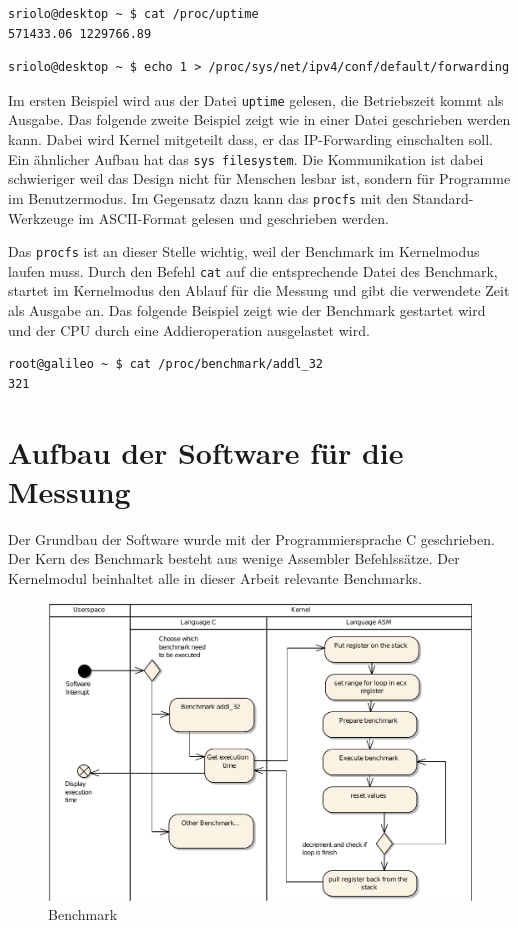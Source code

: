 \lstset{language=Bash}
\begin{lstlisting}
sriolo@desktop ~ $ cat /proc/uptime 
571433.06 1229766.89
\end{lstlisting}
\begin{lstlisting}
sriolo@desktop ~ $ echo 1 > /proc/sys/net/ipv4/conf/default/forwarding
\end{lstlisting}

Im ersten Beispiel wird aus der Datei \texttt{uptime} gelesen, die Betriebszeit kommt als Ausgabe. Das folgende zweite Beispiel zeigt wie in einer Datei geschrieben werden kann. Dabei wird Kernel mitgeteilt dass, er das IP-Forwarding einschalten soll. Ein ähnlicher Aufbau hat das \texttt{sys filesystem}. Die Kommunikation ist dabei schwieriger weil das Design nicht für Menschen lesbar ist, sondern für Programme im Benutzermodus. Im Gegensatz dazu kann das \texttt{procfs} mit den Standard-Werkzeuge im ASCII-Format gelesen und geschrieben werden.
\par
Das \texttt{procfs} ist an dieser Stelle wichtig, weil der Benchmark im Kernelmodus laufen muss. Durch den Befehl \texttt{cat} auf die entsprechende Datei des Benchmark, startet im Kernelmodus den Ablauf für die Messung und gibt die verwendete Zeit als Ausgabe an. Das folgende Beispiel zeigt wie der Benchmark gestartet wird und der CPU durch eine Addieroperation ausgelastet wird.

\begin{lstlisting}
root@galileo ~ $ cat /proc/benchmark/addl_32
321
\end{lstlisting}


\section{Aufbau der Software für die Messung}

Der Grundbau der Software wurde mit der Programmiersprache C geschrieben. Der Kern des Benchmark besteht aus wenige Assembler Befehlssätze. Der Kernelmodul beinhaltet alle in dieser Arbeit relevante Benchmarks. 






\begin{figure}[H]
\centering
\includegraphics[width=1.0\textwidth]{images/benchmark_ea.pdf}
\caption{Benchmark}
\label{fig:Benchmark}
\end{figure}

